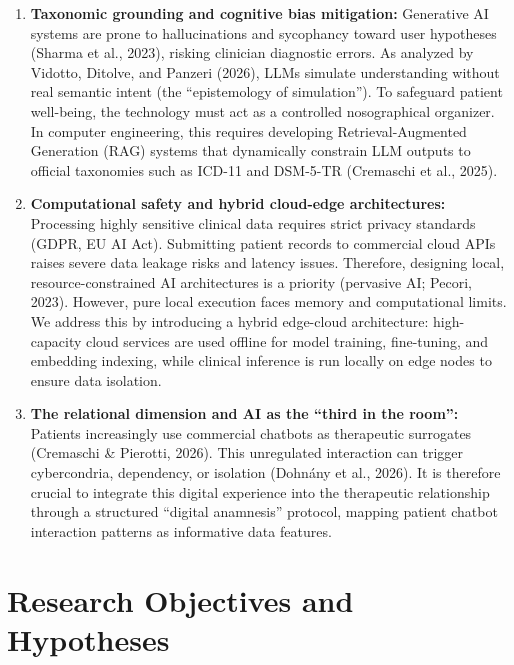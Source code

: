 \documentclass[11pt,a4paper]{article}
\begin{document}
\begin{enumerate}[label=\alph*)]
    \item \textbf{Taxonomic grounding and cognitive bias mitigation:} Generative AI systems are prone to hallucinations and sycophancy toward user hypotheses (Sharma et al., 2023), risking clinician diagnostic errors. As analyzed by Vidotto, Ditolve, and Panzeri (2026), LLMs simulate understanding without real semantic intent (the ``epistemology of simulation''). To safeguard patient well-being, the technology must act as a controlled nosographical organizer. In computer engineering, this requires developing Retrieval-Augmented Generation (RAG) systems that dynamically constrain LLM outputs to official taxonomies such as ICD-11 and DSM-5-TR (Cremaschi et al., 2025).
    
    \item \textbf{Computational safety and hybrid cloud-edge architectures:} Processing highly sensitive clinical data requires strict privacy standards (GDPR, EU AI Act). Submitting patient records to commercial cloud APIs raises severe data leakage risks and latency issues. Therefore, designing local, resource-constrained AI architectures is a priority (pervasive AI; Pecori, 2023). However, pure local execution faces memory and computational limits. We address this by introducing a hybrid edge-cloud architecture: high-capacity cloud services are used offline for model training, fine-tuning, and embedding indexing, while clinical inference is run locally on edge nodes to ensure data isolation.
    
    \item \textbf{The relational dimension and AI as the ``third in the room'':} Patients increasingly use commercial chatbots as therapeutic surrogates (Cremaschi \& Pierotti, 2026). This unregulated interaction can trigger cybercondria, dependency, or isolation (Dohnány et al., 2026). It is therefore crucial to integrate this digital experience into the therapeutic relationship through a structured ``digital anamnesis'' protocol, mapping patient chatbot interaction patterns as informative data features.
\end{enumerate}

\section{Research Objectives and Hypotheses}
\end{document}
